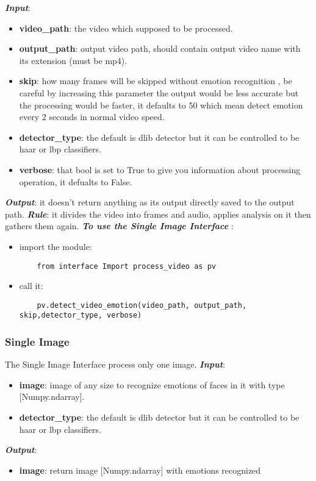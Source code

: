 \newline \textbf{\textit{Input}}: 
\begin{itemize}
	\item  \textbf{video\_path}: the video which supposed to be processed.
	\item  \textbf{output\_path}: output video path, should contain output video name with its extension (must be mp4).
	\item  \textbf{skip}: how many frames will be skipped without emotion recognition , be careful by increasing this parameter the output would be less accurate but the processing would be faster, it defaults to 50 which mean detect emotion every 2 seconds in normal video speed.
	\item \textbf{detector\_type}: the default is dlib detector but it can be controlled to be haar or lbp classifiers.
	\item  \textbf{verbose}: that bool is set to True to give you information about processing operation, it defualts to False.
\end{itemize}
\textbf{\textit{Output}}: it doesn't return anything as its output directly saved to the output path.
\newline\textbf{\textit{ Rule}}: it divides the video into frames and audio, applies analysis on it then gathers them again.
\newline 
\noindent \textbf{\textit{To use the Single Image Interface }}:
\begin{itemize}
	\item import the module:
	\begin{verbatim}
	from interface Import process_video as pv
	\end{verbatim}
	\item call it:
	\begin{verbatim}
	pv.detect_video_emotion(video_path, output_path, skip,detector_type, verbose)
	\end{verbatim}
\end{itemize}


\newpage
\subsubsection{Single Image}

The Single Image Interface process only one image.
\newline
\noindent\textbf{\textit{Input}}:
\begin{itemize}
	\item \textbf{image}:\newline
	image of any size to recognize emotions of faces in it with type [Numpy.ndarray].
	\item \textbf{detector\_type}: the default is dlib detector but it can be controlled to be haar or lbp classifiers.
\end{itemize}
\noindent\textbf{\textit{Output}}:
\begin{itemize}
	\item \textbf{image}:\newline
	return image [Numpy.ndarray] with emotions recognized 
\end{itemize}

